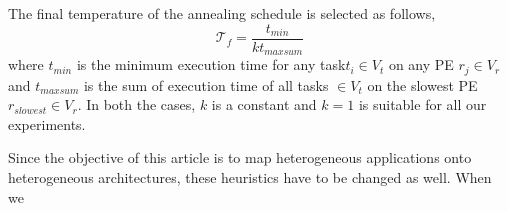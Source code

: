 The final temperature of the annealing schedule is selected as follows,
\begin{equation}
\mathcal{T}_f = \frac{t_{min}}{kt_{maxsum}}
\end{equation}
where $t_{min}$ is the minimum execution time for any task$t_i \in V_t$ on any
PE $r_j \in V_r$ and $t_{maxsum}$ is the sum of execution time of all tasks $\in
V_t$ on the slowest PE $r_{slowest} \in V_r$. In both the cases, $k$ is a
constant and $k=1$ is suitable for all our experiments.

Since the objective of this article is to map heterogeneous applications onto heterogeneous architectures, these heuristics have to be changed as well. When we  

